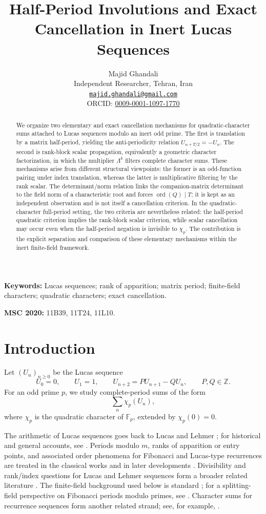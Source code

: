 \documentclass[11pt]{article}
\title{Half-Period Involutions and Exact Cancellation in Inert Lucas Sequences}
\author{
  Majid Ghandali\\
  Independent Researcher, Tehran, Iran\\
  \href{mailto:majid.ghandali@gmail.com}{\texttt{majid.ghandali@gmail.com}}\\
 ORCID:
\href{https://orcid.org/0009-0001-1097-1770}
{0009-0001-1097-1770}
}
\date{}
\newcommand{\ord}{\operatorname{ord}}
\newcommand{\Fp}{\mathbb{F}_p}
\newcommand{\Z}{\mathbb{Z}}
\newcommand{\chiP}{\chi_p}
\theoremstyle{plain}
\theoremstyle{definition}
\begin{document}
\maketitle

\begin{abstract}
We organize two elementary and exact cancellation mechanisms for
quadratic-character sums attached to Lucas sequences modulo an inert odd
prime. The first is translation by a matrix half-period, yielding the
anti-periodicity relation $U_{n+T/2}=-U_n$. The second is rank-block scalar
propagation, equivalently a geometric character factorization, in which the
multiplier $\Lambda^k$ filters complete character sums. These mechanisms
arise from different structural viewpoints: the former is an odd-function
pairing under index translation, whereas the latter is multiplicative
filtering by the rank scalar. The determinant/norm relation links the
companion-matrix determinant to the field norm of a characteristic root and
forces $\ord(Q)\mid T$; it is kept as an independent observation and is not
itself a cancellation criterion. In the quadratic-character full-period
setting, the two criteria are nevertheless related: the half-period
quadratic criterion implies the rank-block scalar criterion, while scalar
cancellation may occur even when the half-period negation is invisible to
$\chiP$. The contribution is the explicit separation and comparison of
these elementary mechanisms within the inert finite-field framework.
\end{abstract}

\noindent\textbf{Keywords:} Lucas sequences; rank of apparition; matrix period; finite-field characters; quadratic characters; exact cancellation.

\noindent\textbf{MSC 2020:} 11B39, 11T24, 11L10.

\section{Introduction}

Let $(U_n)_{n\geq 0}$ be the Lucas sequence
\[
 U_0=0,\qquad U_1=1,\qquad
 U_{n+2}=P U_{n+1}-Q U_n,
 \qquad P,Q\in\Z.
\]
For an odd prime $p$, we study complete-period sums of the form
\[
 \sum_n \chiP(U_n),
\]
where $\chiP$ is the quadratic character of $\Fp$, extended by $\chiP(0)=0$.

The arithmetic of Lucas sequences goes back to Lucas and Lehmer
\cite{Lucas1878,Lehmer1930}; for historical and general accounts, see
\cite{Williams,Everest2003}. Periods modulo $m$, ranks of apparition or
entry points, and associated order phenomena for Fibonacci and Lucas-type
recurrences are treated in the classical works
\cite{Wall1960,Robinson1963,Vinson1963,Somer1980} and in later developments
\cite{Renault1996,Renault2013,FiebigMbirikaSpilker2025}. Divisibility and
rank/index questions for Lucas and Lehmer sequences form a broader related
literature \cite{BHV2001,Stewart2013,Sanna2022,Sanna2024}. The finite-field
background used below is standard \cite{LN}; for a splitting-field
perspective on Fibonacci periods modulo primes, see
\cite{GuptaRockstrohSu2012}. Character sums for recurrence sequences form
another related strand; see, for example, \cite{BlackburnShparlinski2006}.
\end{document}
